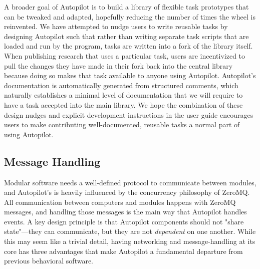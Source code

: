 \documentclass[nohyper, justified, notitlepage, marginals=raggedright,twoside=false,debug]{tufte-autopilot}
\begin{document}
A broader goal of Autopilot is to build a library of flexible task prototypes that can be tweaked and adapted, hopefully reducing the number of times the wheel is reinvented. We have attempted to nudge users to write reusable tasks by designing Autopilot such that rather than writing separate task scripts that are loaded and run by the program, tasks are written into a fork of the library itself. When publishing research that uses a particular task, users are incentivized to pull the changes they have made in their fork back into the central library because doing so makes that task available to anyone using Autopilot. Autopilot's documentation is automatically generated from structured comments, which naturally establishes a minimal level of documentation that we will require to have a task accepted into the main library. We hope the combination of these design nudges and explicit development instructions in the user guide encourages users to make contributing well-documented, reusable tasks a normal part of using Autopilot.


\subsection{Message Handling}

Modular software needs a well-defined protocol to communicate between modules, and Autopilot's is heavily influenced by the concurrency philosophy of ZeroMQ\citep{hintjensZeroMQMessagingMany2013}. All communication between computers and modules happens with ZeroMQ messages, and handling those messages is the main way that Autopilot handles events. A key design principle is that Autopilot components should not "share state"---they can communicate, but they are not \textit{dependent} on one another. While this may seem like a trivial detail, having networking and message-handling at its core has three advantages that make Autopilot a fundamental departure from previous behavioral software.
\end{document}
